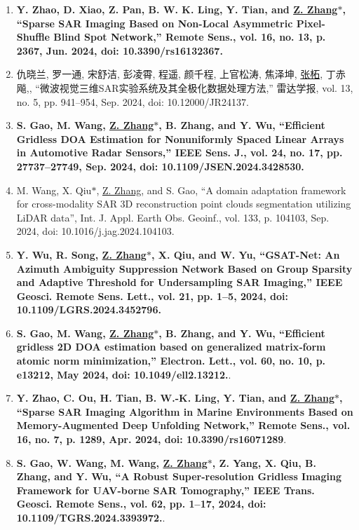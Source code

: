 \documentclass[paper=a4,fontsize=11pt]{scrartcl}
\begin{document}
\begin{enumerate}
\item \textbf{Y. Zhao, D. Xiao, Z. Pan, B. W. K. Ling, Y. Tian, and \underline{Z. Zhang$\ast$}, ``Sparse SAR Imaging Based on Non-Local Asymmetric Pixel-Shuffle Blind Spot Network,'' Remote Sens., vol. 16, no. 13, p. 2367, Jun. 2024, doi: 10.3390/rs16132367.}

\item 仇晓兰, 罗一通, 宋舒洁, 彭凌霄, 程遥, 颜千程, 上官松涛, 焦泽坤, \underline{张柘}, 丁赤飚,, ``微波视觉三维SAR实验系统及其全极化数据处理方法,'' 雷达学报, vol. 13, no. 5, pp. 941–954, Sep. 2024, doi: 10.12000/JR24137.

\item \textbf{S. Gao, M. Wang, \underline{Z. Zhang$\ast$}, B. Zhang, and Y. Wu, ``Efficient Gridless DOA Estimation for Nonuniformly Spaced Linear Arrays in Automotive Radar Sensors,'' IEEE Sens. J., vol. 24, no. 17, pp. 27737–27749, Sep. 2024, doi: 10.1109/JSEN.2024.3428530.}
	
\item M. Wang, X. Qiu$\ast$, \underline{Z. Zhang}, and S. Gao, ``A domain adaptation framework for cross-modality SAR 3D reconstruction point clouds segmentation utilizing LiDAR data'', Int. J. Appl. Earth Obs. Geoinf., vol. 133, p. 104103, Sep. 2024, doi: 10.1016/j.jag.2024.104103.

\item \textbf{Y. Wu, R. Song, \underline{Z. Zhang$\ast$}, X. Qiu, and W. Yu, ``GSAT-Net: An Azimuth Ambiguity Suppression Network Based on Group Sparsity and Adaptive Threshold for Undersampling SAR Imaging,'' IEEE Geosci. Remote Sens. Lett., vol. 21, pp. 1–5, 2024, doi: 10.1109/LGRS.2024.3452796.}
	
\item \textbf{S. Gao, M. Wang, \underline{Z. Zhang$\ast$}, B. Zhang, and Y. Wu, 	``Efficient gridless 2D DOA estimation based on generalized matrix‐form atomic norm minimization,'' Electron. Lett., vol. 60, no. 10, p. e13212, May 2024, doi: 10.1049/ell2.13212.}.
	
\item \textbf{Y. Zhao, C. Ou, H. Tian, B. W.-K. Ling, Y. Tian, and \underline{Z. Zhang$\ast$}, ``Sparse SAR Imaging Algorithm in Marine Environments Based on Memory-Augmented Deep Unfolding Network,'' Remote Sens., vol. 16, no. 7, p. 1289, Apr. 2024, doi: 10.3390/rs16071289}.

\item \textbf{S. Gao, W. Wang, M. Wang, \underline{Z. Zhang$\ast$}, Z. Yang, X. Qiu, B. Zhang, and Y. Wu, ``A Robust Super-resolution Gridless Imaging Framework for UAV-borne SAR Tomography,'' IEEE Trans. Geosci. Remote Sens., vol. 62, pp. 1–17, 2024, doi: 10.1109/TGRS.2024.3393972.}.


\end{enumerate}
\end{document}
